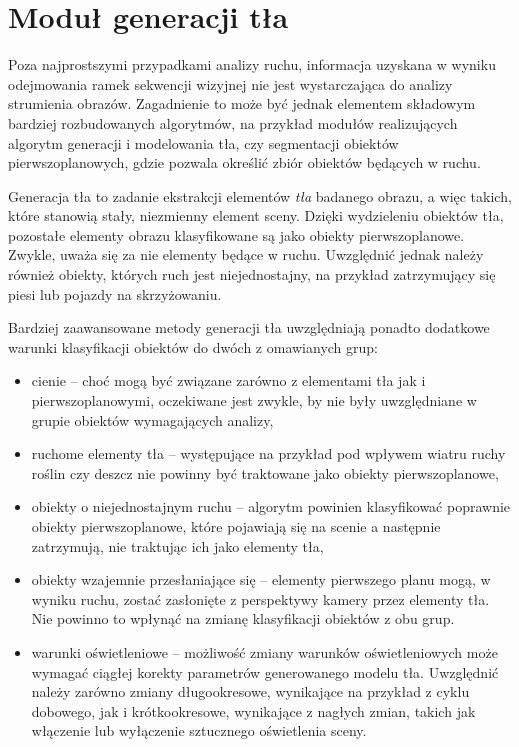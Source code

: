 \section{Moduł generacji tła}

Poza najprostszymi przypadkami analizy ruchu, informacja uzyskana w wyniku odejmowania ramek sekwencji wizyjnej nie jest wystarczająca do analizy strumienia obrazów.
Zagadnienie to może być jednak elementem składowym bardziej rozbudowanych algorytmów, na przykład modułów realizujących algorytm generacji i modelowania tła, czy segmentacji obiektów pierwszoplanowych, gdzie pozwala określić zbiór obiektów będących w ruchu. 

Generacja tła to zadanie ekstrakcji elementów \textit{tła} badanego obrazu, a więc takich, które stanowią stały, niezmienny element sceny. 
Dzięki wydzieleniu obiektów tła, pozostałe elementy obrazu klasyfikowane są jako obiekty pierwszoplanowe. 
Zwykle, uważa się za nie elementy będące w ruchu. 
Uwzględnić jednak należy również obiekty, których ruch jest niejednostajny, na przykład zatrzymujący się piesi lub pojazdy na skrzyżowaniu.

Bardziej zaawansowane metody generacji tła uwzględniają ponadto dodatkowe warunki klasyfikacji obiektów do dwóch z omawianych grup:
\begin{itemize}
	\item cienie -- choć mogą być związane zarówno z elementami tła jak i pierwszoplanowymi, oczekiwane jest zwykle, by nie były uwzględniane w grupie obiektów wymagających analizy,
	\item ruchome elementy tła -- występujące na przykład pod wpływem wiatru ruchy roślin czy deszcz nie powinny być traktowane jako obiekty pierwszoplanowe,
	\item obiekty o niejednostajnym ruchu -- algorytm powinien klasyfikować poprawnie obiekty pierwszoplanowe, które pojawiają się na scenie a następnie zatrzymują, nie traktując ich jako elementy tła, 
	\item obiekty wzajemnie przesłaniające się -- elementy pierwszego planu mogą, w wyniku ruchu, zostać zasłonięte z perspektywy kamery przez elementy tła. Nie powinno to wpłynąć na zmianę klasyfikacji obiektów z obu grup.
	\item warunki oświetleniowe -- możliwość zmiany warunków oświetleniowych może wymagać ciągłej korekty parametrów generowanego modelu tła. Uwzględnić należy zarówno zmiany długookresowe, wynikające na przykład z cyklu dobowego, jak i krótkookresowe, wynikające z nagłych zmian, takich jak włączenie lub wyłączenie sztucznego oświetlenia sceny.
\end{itemize}

